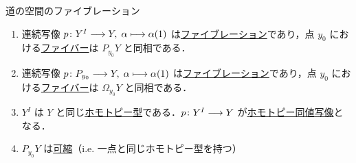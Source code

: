 \documentclass[algtopo_main]{subfiles}
\begin{document}
\begin{mytheo}[label=thm:path-space-fibration]{道の空間のファイブレーション}
    \begin{enumerate}
        \item 連続写像 $p \colon Y^I \longrightarrow Y,\; \alpha \longmapsto \alpha(1)$ は\hyperref[def:fibration]{ファイブレーション}であり，点 $y_0$ における\hyperref[thm:fiber-basic]{ファイバー}は $P_{y_0}Y$ と同相である．
        \item 連続写像 $p \colon P_{y_0} \longrightarrow Y,\; \alpha \longmapsto \alpha(1)$ は\hyperref[def:fibration]{ファイブレーション}であり，点 $y_0$ における\hyperref[thm:fiber-basic]{ファイバー}は $\Omega_{y_0}Y$ と同相である．
        \item $Y^I$ は $Y$ と同じ\hyperref[def:homotopy-basic]{ホモトピー型}である．$p \colon Y^I \longrightarrow Y$ が\hyperref[def:homotopy-basic]{ホモトピー同値写像}となる．
        \item $P_{y_0} Y$ は\hyperref[def:homotopy-basic]{可縮}（i.e. 一点と同じホモトピー型を持つ）
    \end{enumerate}
\end{mytheo}
\end{document}
